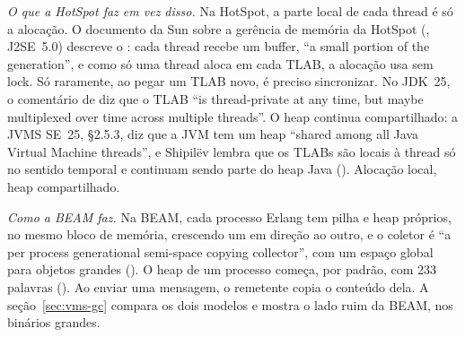 \emph{O que a HotSpot faz em vez disso.} Na HotSpot, a parte local de
cada thread é só a alocação. O documento da Sun sobre a gerência de
memória da HotSpot (, J2SE~5.0)
descreve o : cada
thread recebe um buffer, \enquote{a small portion of the generation}, e
como só uma thread aloca em cada TLAB, a alocação usa
 sem lock. Só raramente, ao pegar um TLAB novo, é
preciso sincronizar. No JDK~25, o comentário de
 diz que o TLAB \enquote{is
thread-private at any time, but maybe multiplexed over time across
multiple threads}. O heap continua compartilhado: a JVMS SE~25, §2.5.3,
diz que a JVM tem um heap \enquote{shared among all Java Virtual Machine
threads}, e Shipilëv lembra que os TLABs são locais à thread só no
sentido temporal e continuam sendo parte do heap Java
(). Alocação local, heap compartilhado.

\emph{Como a BEAM faz.} Na BEAM, cada processo Erlang tem pilha e heap
próprios, no mesmo bloco de memória, crescendo um em direção ao outro, e
o coletor é \enquote{a per process generational semi-space copying
collector}, com um espaço global para objetos grandes
(). O heap de um processo começa, por padrão,
com 233 palavras (). Ao enviar uma
mensagem, o remetente copia o conteúdo dela. A
seção~\ref{sec:vms-gc} compara os dois modelos e mostra o lado ruim da
BEAM, nos binários grandes.
